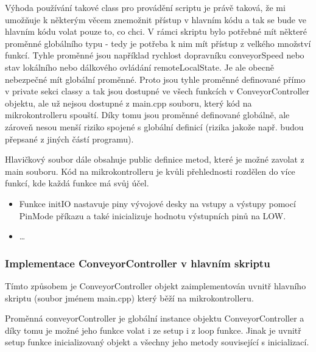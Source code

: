 Výhoda používání takové class pro provádění scriptu je právě taková, že mi umožňuje k některým věcem znemožnit přístup v hlavním kódu a tak se bude ve hlavním kódu volat pouze to, co chci. V rámci skriptu bylo potřebné mít některé proměnné globálního typu - tedy je potřeba k nim mít přístup z velkého množství funkcí. Tyhle proměnné jsou například rychlost dopravníku conveyorSpeed nebo stav lokálního nebo dálkového ovládání remoteLocalState. Je ale obecně nebezpečné mít globální proměnné. Proto jsou tyhle proměnné definované přímo v private sekci classy a tak jsou dostupné ve všech funkcích v ConveyorController objektu, ale už nejsou dostupné z main.cpp souboru, který kód na mikrokontrolleru spouští. Díky tomu jsou proměnné definované globálně, ale zároveň nesou menší riziko spojené s globální definicí (rizika jakože např. budou přepsané z jiných částí programu).

Hlavičkový soubor dále obsahuje public definice metod, které je možné zavolat z main souboru. Kód na mikrokontrolleru je kvůli přehlednosti rozdělen do více funkcí, kde každá funkce má svůj účel.

\begin{itemize}
    \item Funkce initIO nastavuje piny vývojové desky na vstupy a výstupy pomocí PinMode příkazu a také inicializuje hodnotu výstupních pinů na LOW.
    \item \dots
\end{itemize}

\subsubsection{Implementace ConveyorController v hlavním skriptu}\label{sec:ImplementaceConveyorControllerVeMainCpp}

Tímto způsobem je ConveyorController objekt zaimplementován uvnitř hlavního skriptu (soubor jménem main.cpp) který běží na mikrokontrolleru.



Proměnná conveyorController je globální instance objektu ConveyorController a díky tomu je možné jeho funkce volat i ze setup i z loop funkce. Jinak je uvnitř setup funkce inicializovaný objekt a všechny jeho metody související s inicializací.

